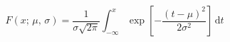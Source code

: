 \documentclass[varwidth, margin=4pt]{standalone}
\begin{document}
\[
    F(x; \, \mu, \, \sigma)
  = \frac{1}{\sigma\sqrt{2\pi}} \int_{-\infty}^x
    \exp \left[ -\frac{(t-\mu)^2}{2\sigma^2} \right] \, \mathrm{d} t
\]
\end{document}

